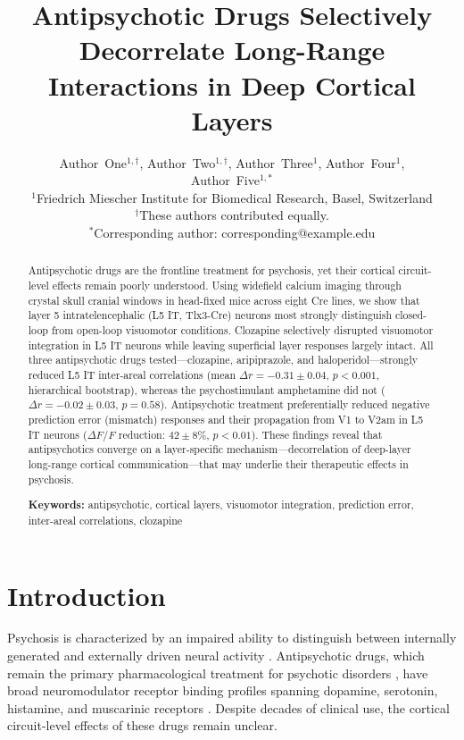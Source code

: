 \documentclass[11pt]{article}
\title{Antipsychotic Drugs Selectively Decorrelate Long-Range Interactions in Deep Cortical Layers}
\author{
Author~One$^{1,\dagger}$, Author~Two$^{1,\dagger}$, Author~Three$^{1}$, Author~Four$^{1}$, \\
Author~Five$^{1,*}$ \\[6pt]
$^{1}$Friedrich Miescher Institute for Biomedical Research, Basel, Switzerland \\[4pt]
$^{\dagger}$These authors contributed equally. \\
$^{*}$Corresponding author: corresponding@example.edu
}
\date{}
\begin{document}
\maketitle

\begin{abstract}
Antipsychotic drugs are the frontline treatment for psychosis, yet their cortical circuit-level effects remain poorly understood. Using widefield calcium imaging through crystal skull cranial windows in head-fixed mice across eight Cre lines, we show that layer 5 intratelencephalic (L5 IT, Tlx3-Cre) neurons most strongly distinguish closed-loop from open-loop visuomotor conditions. Clozapine selectively disrupted visuomotor integration in L5 IT neurons while leaving superficial layer responses largely intact. All three antipsychotic drugs tested---clozapine, aripiprazole, and haloperidol---strongly reduced L5 IT inter-areal correlations (mean $\Delta r = -0.31 \pm 0.04$, $p < 0.001$, hierarchical bootstrap), whereas the psychostimulant amphetamine did not ($\Delta r = -0.02 \pm 0.03$, $p = 0.58$). Antipsychotic treatment preferentially reduced negative prediction error (mismatch) responses and their propagation from V1 to V2am in L5 IT neurons ($\Delta F/F$ reduction: $42 \pm 8\%$, $p < 0.01$). These findings reveal that antipsychotics converge on a layer-specific mechanism---decorrelation of deep-layer long-range cortical communication---that may underlie their therapeutic effects in psychosis.

\vspace{0.5em}
\noindent\textbf{Keywords:} antipsychotic, cortical layers, visuomotor integration, prediction error, inter-areal correlations, clozapine
\end{abstract}

\section{Introduction}

Psychosis is characterized by an impaired ability to distinguish between internally generated and externally driven neural activity \citep{adams2013computational, friston2005theory}. Antipsychotic drugs, which remain the primary pharmacological treatment for psychotic disorders \citep{lieberman2018effectiveness, correll2017current}, have broad neuromodulator receptor binding profiles spanning dopamine, serotonin, histamine, and muscarinic receptors \citep{kapur2005dopamine, meltzer2013serotonin, seeman2006targeting}. Despite decades of clinical use, the cortical circuit-level effects of these drugs remain unclear.
\end{document}
